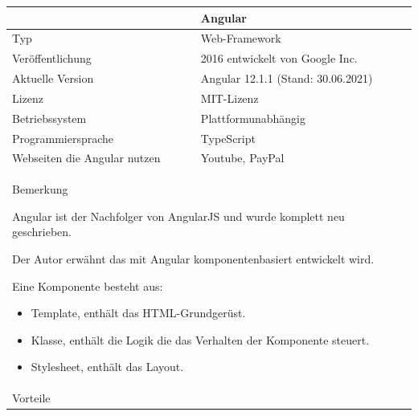 \begin{longtable}{|l|l|l|}
	\hline
\rowcolor[gray]{0.6}	 & \multicolumn{2}{p{9.0cm}|}{ \textbf{Angular}} \\
\hline
	\hline
	Typ & \multicolumn{2}{l|}{Web-Framework } \\
	\hline
	Veröffentlichung & \multicolumn{2}{l|}{2016 entwickelt von Google Inc. \cite{AngularReactVergleich}} \\
	\hline
	Aktuelle Version & \multicolumn{2}{l|}{Angular 12.1.1 (Stand: 30.06.2021) } \\
	\hline
	Lizenz & \multicolumn{2}{l|}{MIT-Lizenz} \\
	\hline
	Betriebssystem & \multicolumn{2}{l|}{Plattformunabhängig} \\
	\hline
	Programmiersprache & \multicolumn{2}{l|}{TypeScript} \\
	\hline
	Webseiten die Angular nutzen & \multicolumn{2}{l|}{Youtube, PayPal} \\
	\hline
	\hline
	\multicolumn{3}{|p{14.0cm}|}{
	Bemerkung
	
Angular ist der Nachfolger von AngularJS und wurde komplett neu geschrieben. 

Der Autor \cite{AngularReactVergleich5} erwähnt das mit Angular komponentenbasiert entwickelt wird. 
		
	Eine Komponente besteht aus: \cite{AngularReactVergleich5}
	\begin{itemize}
		\itemsep0pt
		\item Template, enthält das HTML-Grundgerüst.
		\item Klasse, enthält die Logik die das Verhalten der Komponente steuert.
		\item Stylesheet, enthält das Layout.
	\end{itemize}
	} \\
	\hline
	\hline
	\multicolumn{3}{|p{12.0cm}|}{
		Vorteile
	
}
\end{longtable}
